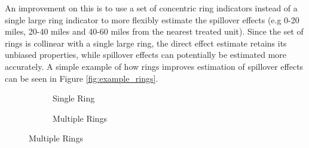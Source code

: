 \documentclass[11pt]{article}
\begin{document}
An improvement on this is to use a set of concentric ring indicators instead of a single large ring indicator to more flexibly estimate the spillover effects (e.g 0-20 miles, 20-40 miles and 40-60 miles from the nearest treated unit). Since the set of rings is collinear with a single large ring, the direct effect estimate retains its unbiased properties, while spillover effects can potentially be estimated more accurately. A simple example of how rings improves estimation of spillover effects can be seen in Figure \ref{fig:example_rings}.

\begin{figure}[tb!]
    \caption{Rings Improve Estimation of Spillover Effects}
    \label{fig:example_rings}

    \begin{subfigure}{\textwidth}
        \caption{Single Ring}
        \begin{center}
        \end{center}
        
    \end{subfigure}
    \begin{subfigure}{\textwidth}
        \caption{Multiple Rings}
        \begin{center}
        \end{center}
    \end{subfigure}


\end{figure}
\end{document}
